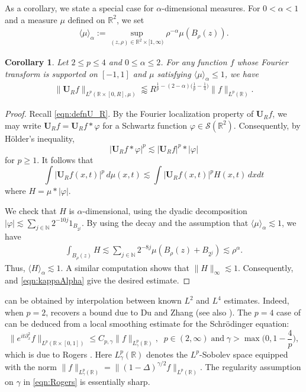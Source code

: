 \documentclass[11pt]{amsart}
\newtheorem{coro}[theorem]{Corollary}
\theoremstyle{definition}
\theoremstyle{remark}
\newcommand{\R}{\mathbb{R}}
\newcommand{\N}{\mathbb{N}}
\newcommand{\bU}{\mathbf{U}}
\newcommand{\les}{\lesssim}
\newcommand{\less}{\lessapprox}
\newcommand{\inn}[1]{\langle  #1 \rangle}
\begin{document}
As a corollary, we state a special case for $\alpha$-dimensional measures.
For $0<\alpha<1$ and a measure $\mu$ defined on $\R^2$, we set
    \begin{align}\label{mu_ball}
    \inn{\mu}_\alpha := \sup_{(z,\rho)\in \R^2\times [1,\infty) } \rho^{-\alpha} \mu(B_\rho(z)). \end{align}
\begin{coro}\label{cor:SchFreqLocal}
	 Let $2\leq p\leq 4$ and $0\leq \alpha\leq 2$. 
     For any function $f$ whose Fourier transform is supported on $[-1,1]$ and $\mu$ satisfying $\inn{\mu}_\alpha \le1$, we have 
     \begin{align*}
\big\| \mathbf{U}_R f \big\|_{L^p(\R\times[0,R], \mu)} \less  R^{\frac1p-(2-\alpha)\big(\frac1p-\frac14\big)} \| f\|_{L^p(\R)}.
\end{align*}
\end{coro}
\begin{proof}
Recall \eqref{eqn:defnU_R}.
    By the Fourier localization property of $\bU_R f$, we may write $\bU_R f = \bU_R f * \varphi$ for a Schwartz function $\varphi \in \mathcal S(\R^2)$. 
    Consequently, by H\"{o}lder's inequality,
\[
\big|\mathbf U_Rf \ast \varphi \big|^p
\lesssim |\mathbf U_Rf|^p \ast |\varphi|
\]
for $p\ge1$. It follows that
\[
\int \big|\mathbf U_Rf(x,t)\big|^p\,d\mu(x,t)
\lesssim
\int \big|\mathbf U_Rf(x,t)\big|^p H(x,t)\,dxdt
\]
where 
$
   H=\mu \ast |\varphi|. 
$

We check that $H$ is $\alpha$-dimensional, using the dyadic decomposition $|\varphi|\les \sum_{j\in \N} 2^{-10j} 1_{B_{2^j}}$.  By using the decay and the assumption that $\inn{\mu}_{\alpha}\les 1$, we have
\begin{align*}
    \int_{B_\rho(z)} H  \les \sum_{j\in \N} 2^{-8j} \mu( B_{\rho}(z) + B_{2^j} ) \les \rho^{\alpha}.
\end{align*}
Thus, $\inn{H}_\alpha\les 1$. A similar computation shows that $\| H\|_{\infty} \les 1$. Consequently,  and \eqref{eqn:kappaAlpha} give the desired estimate. 
\end{proof}

 can be obtained by interpolation between known $L^2$ and $L^4$ estimates. Indeed, when $p=2$,  recovers a bound due to Du and Zhang \cite{DuZhang} (see also \cite{Wolff2, Erdogan}). The $p=4$ case of  can be deduced from a local smoothing estimate for the Schr\"odinger equation:
\begin{equation}\label{eqn:Rogers}
	\| e^{it\partial_x^2} f \|_{L^p(\R\times [0,1])} \leq C_{p,\gamma} \| f\|_{L^p_\gamma(\R)},\;\; p\in (2,\infty) \; \text{and} \; \gamma>\max\Big(0,1-\frac{4}{p}\Big),
\end{equation}
which is due to  Rogers \cite{Rogers}.  Here $L^p_\gamma(\R)$ denotes the $L^p$-Sobolev space equipped with the norm $\|f\|_{L_\gamma^p(\R)}=\|(1-\Delta)^{\gamma/2}f\|_{L^p(\R)}$. The regularity assumption on $\gamma$ in \eqref{eqn:Rogers} is essentially sharp. 
\end{document}
